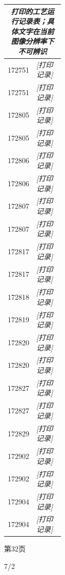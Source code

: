 \documentclass[UTF8,10pt,a4paper,fontset=fandol]{ctexart}
\newcommand{\handwritten}[1]{#1}
\begin{document}
\begin{center}
\begin{minipage}[t]{0.47\textwidth}
\small
\begin{tabularx}{\linewidth}{|p{0.22\linewidth}|X|}
\hline
\multicolumn{2}{|c|}{\textit{打印的工艺运行记录表；具体文字在当前图像分辨率下不可辨识}}\\
\hline
172751 & \textit{[打印记录]}\\ \hline
172751 & \textit{[打印记录]}\\ \hline
172805 & \textit{[打印记录]}\\ \hline
172805 & \textit{[打印记录]}\\ \hline
172806 & \textit{[打印记录]}\\ \hline
172806 & \textit{[打印记录]}\\ \hline
172807 & \textit{[打印记录]}\\ \hline
172807 & \textit{[打印记录]}\\ \hline
172817 & \textit{[打印记录]}\\ \hline
172817 & \textit{[打印记录]}\\ \hline
172818 & \textit{[打印记录]}\\ \hline
172819 & \textit{[打印记录]}\\ \hline
172820 & \textit{[打印记录]}\\ \hline
172820 & \textit{[打印记录]}\\ \hline
172827 & \textit{[打印记录]}\\ \hline
172827 & \textit{[打印记录]}\\ \hline
172829 & \textit{[打印记录]}\\ \hline
172902 & \textit{[打印记录]}\\ \hline
172902 & \textit{[打印记录]}\\ \hline
172904 & \textit{[打印记录]}\\ \hline
172904 & \textit{[打印记录]}\\ \hline
\end{tabularx}

\vspace{1mm}
第32页
\end{minipage}
\end{center}

\handwritten{7/2}

\newpage
\end{document}
